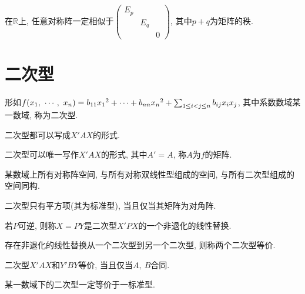 \begin{inference}
    在$\mathbb{R}$上, 任意对称阵一定相似于$\begin{pmatrix}
        E_p &     &\\
            & E_q &\\
            &     &0
    \end{pmatrix}$, 其中$p+q$为矩阵的秩.
\end{inference}

\section{ 二次型 }

\begin{definition}[二次型]
    形如$f({x}{_1},\ \cdots,\ {x}{_{n}})=b_{11}{x_1}^2+\cdots+b_{nn}{x_n}^2+\sum_{1\le i<j \le n}b_{ij}x_ix_j$, 其中系数数域某一数域, 称为二次型.\par
    二次型都可以写成$X'AX$的形式.
\end{definition}

\begin{lemma}
    二次型可以唯一写作$X'AX$的形式, 其中$A'=A$, 称$A$为$f$的矩阵.
\end{lemma}

\begin{example}
    某数域上所有对称阵空间, 与所有对称双线性型组成的空间, 与所有二次型组成的空间同构.
\end{example}

\begin{definition}[二次型的标准型]
    二次型只有平方项(其为标准型), 当且仅当其矩阵为对角阵.
\end{definition}

\begin{definition}[非退化的线性替换]
    若$P$可逆, 则称$X=PY$是二次型$X'PX$的一个非退化的线性替换.
\end{definition}

\begin{definition}[二次型的等价]
    存在非退化的线性替换从一个二次型到另一个二次型, 则称两个二次型等价.
\end{definition}

\begin{inference}
    二次型$X'AX$和$Y'BY$等价, 当且仅当$A,\ B$合同.
\end{inference}

\begin{inference}
    某一数域下的二次型一定等价于一标准型.
\end{inference}

